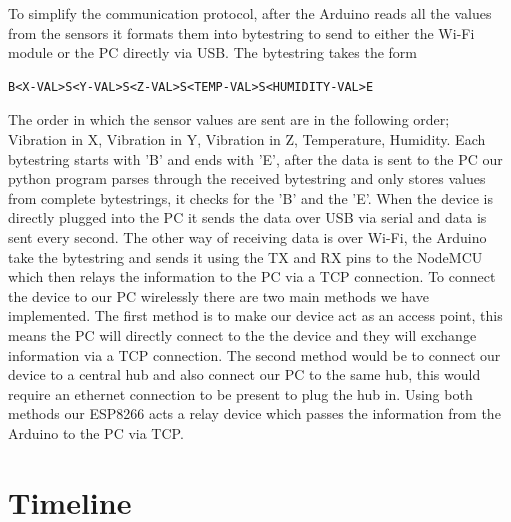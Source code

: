 \documentclass[12pt, titlepage]{article}
\begin{document}
To simplify the communication protocol, after the Arduino reads all the values from the sensors it formats them into bytestring to send to either the Wi-Fi module or the PC directly via USB. The bytestring takes the form

\begin{verbatim}
B<X-VAL>S<Y-VAL>S<Z-VAL>S<TEMP-VAL>S<HUMIDITY-VAL>E
\end{verbatim}

The order in which the sensor values are sent are in the following order; Vibration in X, Vibration in Y, Vibration in Z, Temperature, Humidity. Each bytestring starts with 'B' and ends with 'E', after the data is sent to the PC our python program parses through the received bytestring and only stores values from complete bytestrings, it checks for the 'B' and the 'E'. When the device is directly plugged into the PC it sends the data over USB via serial and data is sent every second. The other way of receiving data is over Wi-Fi, the Arduino take the bytestring and sends it using the TX and RX pins to the NodeMCU which then relays the information to the PC via a TCP connection.
\newline
\newline
To connect the device to our PC wirelessly there are two main methods we have implemented. The first method is to make our device act as an access point, this means the PC will directly connect to the the device and they will exchange information via a TCP connection. The second method would be to connect our device to a central hub and also connect our PC to the same hub, this would require an ethernet connection to be present to plug the hub in. Using both methods our ESP8266 acts a relay device which passes the information from the Arduino to the PC via TCP.



\section{Timeline}


% 

\newpage{}

\appendix
\end{document}
